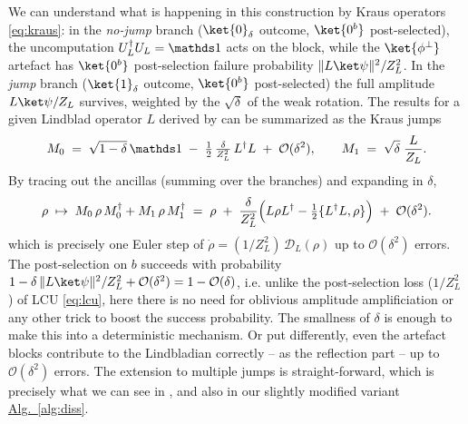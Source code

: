 We can understand what is happening in this construction by Kraus operators \eqref{eq:kraus}: in the \emph{no-jump} branch  ($\ket{0}_\delta$ outcome, $\ket{0^b}$ post-selected), the uncomputation $U_L^\dagger U_L = \idm$ acts on the block, while the $\ket{\phi^\perp}$ artefact has $\ket{0^b}$ post-selection failure probability $\|L\ket\psi\|^2/Z_L^2$. In the \emph{jump} branch ($\ket{1}_\delta$ outcome, $\ket{0^b}$ post-selected) the full amplitude $L\ket\psi/Z_L$ survives, weighted by the $\sqrt{\delta}$ of the weak rotation. The results for a given Lindblad operator $L$ derived by \cite{chen2023quantum} can be summarized as the Kraus jumps
\begin{equation}
    M_0 \;=\; \sqrt{1-\delta}\,\idm \;-\; \tfrac{1}{2}\,\tfrac{\delta}{Z_L^2}\,L^\dagger L \;+\; \mathcal{O}(\delta^2), \qquad M_1 \;=\; \sqrt{\delta}\;\frac{L}{Z_L}.
\end{equation}
By tracing out the ancillas (summing over the branches) and expanding in $\delta$,
\begin{equation} \label{eq:weak-meas-euler}
    \rho \;\mapsto\; M_0\,\rho\,M_0^\dagger + M_1\,\rho\,M_1^\dagger \;=\; \rho \;+\; \frac{\delta}{Z_L^{2}}\Bigl(L\rho L^\dagger - \tfrac{1}{2}\{L^\dagger L,\rho\}\Bigr) \;+\; \mathcal{O}(\delta^{2}).
\end{equation}
which is precisely one Euler step of $\dot\rho = (1/Z_L^2)\,\mathcal{D}_L(\rho)$ up to $\mathcal{O}(\delta^2)$ errors. The post-selection on $b$ succeeds with probability $1 - \delta\,\|L\ket\psi\|^2/Z_L^2 + \mathcal{O}(\delta^2) = 1 - \mathcal{O}(\delta)$, i.e. unlike the post-selection loss ($1/Z_L^2$) of LCU \eqref{eq:lcu}, here there is no need for oblivious amplitude amplificiation or any other trick to boost the success probability. The smallness of $\delta$ is enough to make this into a deterministic mechanism. Or put differently, even the artefact blocks contribute to the Lindbladian correctly -- as the reflection part -- up to $\mathcal{O}(\delta^2)$ errors. The extension to multiple jumps is straight-forward, which is precisely what we can see in \cite{chen2023quantum,chen2023efficient}, and also in our slightly modified variant \hyperref[alg:diss]{Alg.~\ref*{alg:diss}}.

